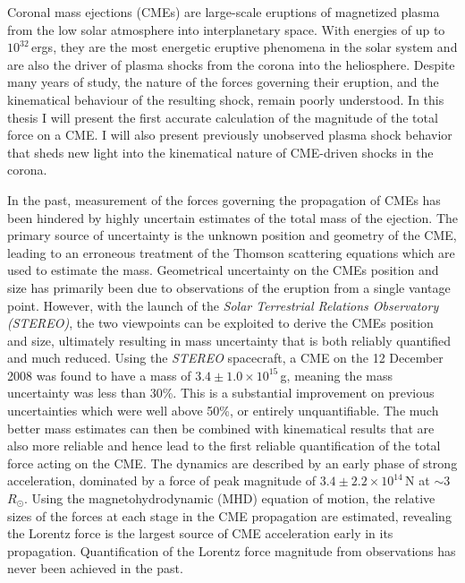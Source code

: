 
\begin{abstracts} 

Coronal mass ejections (CMEs) are large-scale eruptions of magnetized plasma from the low solar atmosphere into interplanetary space. With energies of up to $10^{32}$\,ergs, they are the most energetic eruptive phenomena in the solar system and are also the driver of plasma shocks from the corona into the heliosphere. Despite many years of study, the nature of the forces governing their eruption, and the kinematical {\color{blue}behaviour} of the resulting shock, remain poorly understood. In this thesis I will present the first accurate calculation of the magnitude of the total force on a CME. I will also present previously unobserved plasma shock behavior that sheds new light into the kinematical nature of CME-driven shocks in the corona.

In the past, measurement of the forces governing the propagation of CMEs has been hindered by highly uncertain estimates of the total mass of the ejection. The primary source of uncertainty is the unknown position and geometry of the CME, leading to an erroneous treatment of the Thomson scattering equations which are used to estimate the mass. Geometrical uncertainty on the CMEs position and size has primarily been due to observations of the eruption from a single vantage point. However, with the launch of the {\it Solar Terrestrial Relations Observatory (STEREO)}, the two viewpoints can be exploited to derive the CMEs position and size, ultimately resulting in mass uncertainty that is both reliably quantified and much reduced. Using the {\it STEREO} spacecraft, a CME on the 12 December 2008 was found to have a mass of $3.4\pm1.0\times10^{15}$\,g, meaning the mass uncertainty was less than 30\%. This is a substantial improvement on previous uncertainties which were well above 50\%, or entirely unquantifiable. The much better mass estimates can then be combined with kinematical results that are also more reliable and hence lead to the first reliable quantification of the total force acting on the CME. The dynamics are described by an early phase of strong acceleration, dominated by a force of peak magnitude of $3.4\pm2.2\times10^{14}$\,N at $\sim$3\,$R_{\odot}$. Using the magnetohydrodynamic (MHD) equation of motion, the relative sizes of the forces at each stage in the CME propagation are estimated, revealing the Lorentz force is the largest source of CME acceleration early in its propagation. Quantification of the Lorentz force magnitude from observations has never been achieved in the past.



\end{abstracts}
